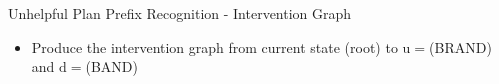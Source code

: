 \begin{frame}{Unhelpful Plan Prefix Recognition - Intervention Graph}
\begin{itemize}
\item Produce the intervention graph from current state (root) to $\mathrm{u}=$(BRAND) and $\mathrm{d}=$(BAND)
\end{itemize}

\begin{figure}[tb]
\end{figure} 

\end{frame}